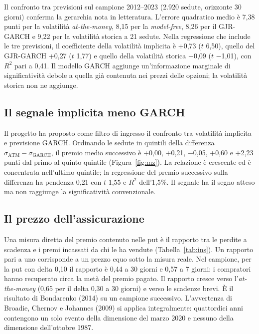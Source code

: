 \documentclass[11pt,a4paper]{article}
\begin{document}
Il confronto tra previsioni sul campione 2012--2023 (2.920 sedute, orizzonte 30 giorni) conferma la gerarchia nota in letteratura. L'errore quadratico medio è 7{,}38 punti per la volatilità \emph{at-the-money}, 8{,}15 per la \emph{model-free}, 8{,}26 per il GJR-GARCH e 9{,}22 per la volatilità storica a 21 sedute. Nella regressione che include le tre previsioni, il coefficiente della volatilità implicita è +0{,}73 ($t$ 6{,}50), quello del GJR-GARCH +0{,}27 ($t$ 1{,}77) e quello della volatilità storica $-$0{,}09 ($t$ $-$1{,}01), con $R^2$ pari a 0{,}41. Il modello GARCH aggiunge un'informazione marginale di significatività debole a quella già contenuta nei prezzi delle opzioni; la volatilità storica non ne aggiunge.

\subsection{Il segnale implicita meno GARCH}

Il progetto ha proposto come filtro di ingresso il confronto tra volatilità implicita e previsione GARCH. Ordinando le sedute in quintili della differenza $\sigma_{\mathrm{ATM}}-\sigma_{\mathrm{GARCH}}$, il premio medio successivo è +0{,}00, +0{,}21, $-$0{,}05, +0{,}60 e +2{,}23 punti dal primo al quinto quintile (Figura~\ref{fig:mz}). La relazione è crescente ed è concentrata nell'ultimo quintile; la regressione del premio successivo sulla differenza ha pendenza 0{,}21 con $t$ 1{,}55 e $R^2$ dell'1{,}5\%. Il segnale ha il segno atteso ma non raggiunge la significatività convenzionale.

\subsection{Il prezzo dell'assicurazione}

Una misura diretta del premio contenuto nelle put è il rapporto tra le perdite a scadenza e i premi incassati da chi le ha vendute (Tabella~\ref{tab:ins}). Un rapporto pari a uno corrisponde a un prezzo equo sotto la misura reale. Nel campione, per la put con delta 0{,}10 il rapporto è 0{,}44 a 30 giorni e 0{,}57 a 7 giorni: i compratori hanno recuperato circa la metà del premio pagato. Il rapporto cresce verso l'\emph{at-the-money} (0{,}65 per il delta 0{,}30 a 30 giorni) e verso le scadenze brevi. È il risultato di Bondarenko (2014) su un campione successivo. L'avvertenza di Broadie, Chernov e Johannes (2009) si applica integralmente: quattordici anni contengono un solo evento della dimensione del marzo 2020 e nessuno della dimensione dell'ottobre 1987.
\end{document}

